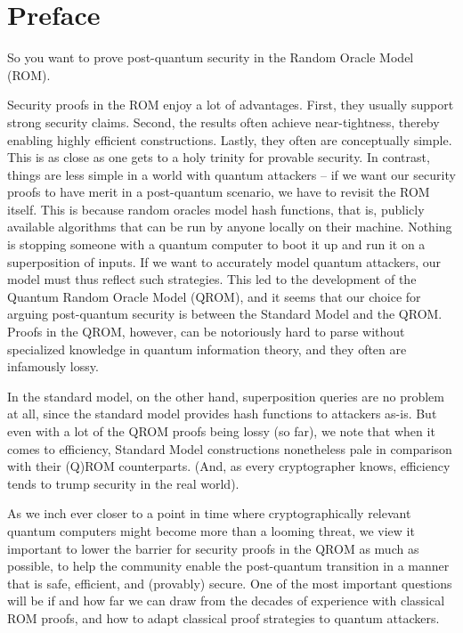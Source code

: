 \section{Preface}
  So you want to prove post-quantum security in the Random Oracle Model (ROM).

  Security proofs in the ROM enjoy a lot of advantages.
  	First, they usually support strong security claims.
  	Second, the results often achieve near-tightness, 
  	thereby enabling highly efficient constructions.
  	Lastly, they often are conceptually simple.
  	This is as close as one gets to a holy trinity for provable security.
  	In contrast, things are less simple in a world with quantum attackers --
  	if we want our security proofs to have merit in a post-quantum scenario, 
  	we have to revisit the ROM itself.
  	This is because random oracles model hash functions,
  	that is, publicly available algorithms that can be run by anyone
  	locally on their machine.
  	Nothing is stopping someone with a quantum computer to
  	boot it up and run it on a superposition of inputs.
  	If we want to accurately model quantum attackers, 
  	our model must thus reflect such strategies. 
  	This led to the development of the Quantum Random Oracle Model (QROM),
  	and it seems that our choice for arguing post-quantum security
  	is between the Standard Model and the QROM. 
  	Proofs in the %
    QROM, however,
  	can be notoriously hard to parse without specialized
  	knowledge in quantum information theory, and they often are infamously lossy.

  In the standard model, on the other hand,
  	superposition queries are no problem at all,
    since the standard model provides hash functions to attackers as-is.
    But even with a lot of the QROM proofs being lossy (so far),
    we note that when it comes to efficiency,
    Standard Model constructions nonetheless pale in comparison 
    with their (Q)ROM counterparts.
    (And, as every cryptographer knows, efficiency
    tends to trump security in the real world).

  As we inch ever closer to a point in time where cryptographically relevant
  	quantum computers might become more than a looming threat,
    we view it important to lower the barrier for security proofs in the QROM
    as much as possible, to help the community enable the post-quantum transition
    in a manner that is safe, efficient, and (provably) secure.
    One of the most important questions will be if and how far we can draw
    from the decades of experience with classical ROM proofs,
    and how to adapt classical proof strategies to quantum attackers.

